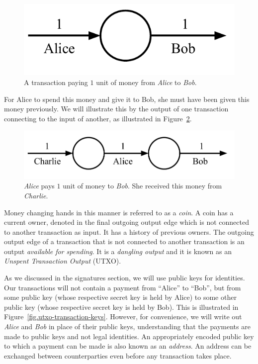 \begin{figure}[h]
    \centering
    \includegraphics[width=0.35 \columnwidth,keepaspectratio]{figures/utxo-transaction.pdf}
    \caption{A transaction paying $1$ unit of money from \emph{Alice} to \emph{Bob}.}
    \label{fig.utxo-transaction}
\end{figure}

For Alice to spend this money and give it to Bob, she must have been given this money previously.
We will illustrate this by the output of one transaction connecting to the input of another,
as illustrated in Figure~\ref{fig.utxo-transaction-chain}.

\begin{figure}[h]
    \centering
    \includegraphics[width=0.55 \columnwidth,keepaspectratio]{figures/utxo-transaction-chain.pdf}
    \caption{\emph{Alice} pays $1$ unit of money to \emph{Bob}. She received this money from \emph{Charlie}.}
    \label{fig.utxo-transaction-chain}
\end{figure}

Money changing hands in this manner is referred to as a \emph{coin}. A coin has a current owner,
denoted in the final outgoing output edge which is not connected to another transaction as input.
It has a history of previous owners. The outgoing output
edge of a transaction that is not connected to another transaction is an output \emph{available for spending}.
It is a \emph{dangling output} and
it is known as an \emph{Unspent Transaction Output} (UTXO).

As we discussed in the signatures section, we will use public keys for identities. Our transactions
will not contain a payment from ``Alice'' to ``Bob'', but from some public key (whose respective secret key
is held by Alice) to some other public key (whose respective secret key is held by Bob). This is
illustrated in Figure~\ref{fig.utxo-transaction-keys}. However, for convenience, we will write out
\emph{Alice} and \emph{Bob} in place of their public keys, understanding that the payments are
made to public keys and not legal identities. An appropriately encoded public key to which a payment can be made is
also known as an \emph{address}. An address can be exchanged between counterparties
even before any transaction takes place.

